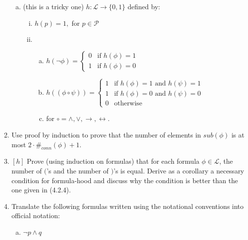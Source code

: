 \begin{enumerate}[\thesection.1]
\begin{enumerate}[(a)]
					\item (this is a tricky one) $h:\mathcal{L}\to\{0,1\}$ defined by:
				
					\begin{enumerate}[(i)]

					\item $h(p)=1,$ for $p\in\mathcal{P}$

					\item 			\begin{enumerate}[(a)]

					\item $h(\neg \phi)=\begin{cases}
					0 &\text{if }h(\phi)=1\\
					1 & \text{if }h(\phi)=0
					\end{cases}$

					\item $h((\phi\circ \psi))=\begin{cases}
					1&\text{if }h(\phi)=1\text{ and }h(\psi)=1\\
					1&\text{if }h(\phi)=0\text{ and }h(\psi)=0\\
					0 & \text{otherwise}
					\end{cases}$ 
					
					\item[] for $\circ=\land,\lor,\to,\leftrightarrow.$
					
					\end{enumerate}
					\end{enumerate}
			
			\end{enumerate} 
		
		\item Use proof by induction to prove that the number of elements in $sub(\phi)$ is at most $2\cdot \#_{conn}(\phi)+1$.

		\item $[h]$ Prove (using induction on formulas) that for each formula $\phi\in\mathcal{L}$, the number of $($'s and the number of $)$'s is equal. Derive as a corollary a necessary condition for formula-hood and discuss why the condition is better than the one given in (4.2.4).
		
		\item Translate the following formulas written using the notational conventions into official notation:
		
		\begin{enumerate}[(a)]

		\item  $\neg p\land q$


\end{enumerate}
\end{enumerate}
